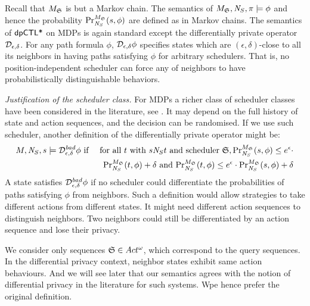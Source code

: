 Recall that $M_{\scheduler{S}}$ is but a Markov chain. The semantics
of $M_{\scheduler{S}}, \neighbor{S}, \pi \models \phi$ and hence the
probability $\myPr{s}{M_{\scheduler{S}}}{\neighbor{S}}{\phi}$ are
defined as in Markov chains.
The semantics of $\dpCTLstar$ on MDPs
is again standard except the differentially private operator
$\dpriv{\epsilon}{\delta}$. For any path formula $\phi$,
$\dpriv{\epsilon}{\delta} \phi$ specifies states which are $(\epsilon,
\delta)$-close to all its neighbors in having paths satisfying $\phi$
for arbitrary schedulers. That is, no
position-independent scheduler can force any of neighbors to have
probabilistically distinguishable behaviors.

\noindent
\emph{Justification of the scheduler class.}
For MDPs a richer class of scheduler classes have been considered in the literature, see \cite{BK:08:PMC}. It may depend on the full history of state and action sequences, and the decision can be randomised. If we use such scheduler, another definition of the differentially private operator
might be:
\begin{eqnarray*}
  M, \neighbor{S}, s \models \dpriv{\epsilon}{\delta}^{\mathit{bad}} \phi
  & \textmd{ if } &
  \textmd{for all } t \textmd{ with } s \neighbor{S} t \textmd{ and
  scheduler } \scheduler{S},
  \myPr{s}{M_{\scheduler{S}}}{\neighbor{S}}{\phi} \leq
  e^{\epsilon} \cdot\\
  && \myPr{t}{M_{\scheduler{S}}}{\neighbor{S}}{\phi} + \delta \textmd{ and }
  \myPr{t}{M_{\scheduler{S}}}{\neighbor{S}}{\phi} \leq
  e^{\epsilon} \cdot \myPr{s}{M_{\scheduler{S}}}{\neighbor{S}}{\phi}
  + \delta
\end{eqnarray*}
A state satisfies $\dpriv{\epsilon}{\delta}^{\mathit{bad}} \phi$ if
no scheduler could differentiate the probabilities of paths satisfying
$\phi$ from neighbors. Such a definition would allow strategies to
take different actions from different states. It might need different
action sequences to distinguish neighbors. Two neighbors could still be
differentiated by an action sequence and lose their privacy.

We consider only sequences $\scheduler{S}\in Act^\omega$, which correspond to the query sequences. In the differential privacy context, neighbor states exhibit same action behaviours. And we will see later that
our semantics agrees with the notion of differential privacy in the literature for such systems.
Wpe hence
prefer the original definition.


